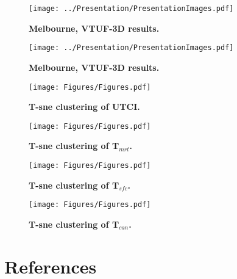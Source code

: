 \documentclass[final,3p,times,authoryear]{elsarticle}
\begin{document}
\begin{figure*}
\centering
\texttt{[image: ../Presentation/PresentationImages.pdf]}
\caption{\bf Melbourne, VTUF-3D results.}
 \label{fig:scenarios}
\end{figure*} 



\begin{figure*}
\centering
\texttt{[image: ../Presentation/PresentationImages.pdf]}
\caption{\bf Melbourne, VTUF-3D results.}
\end{figure*} 


\begin{figure*}
\centering
\texttt{[image: Figures/Figures.pdf]}
\caption{\bf T-sne clustering of UTCI.}
 \label{fig:clusterutci}
\end{figure*} 

\begin{figure*}
\centering
\texttt{[image: Figures/Figures.pdf]}
\caption{\bf T-sne clustering of T$_{mrt}$.}
 \label{fig:clustertmrt}
\end{figure*} 

\begin{figure*}
\centering
\texttt{[image: Figures/Figures.pdf]}
\caption{\bf T-sne clustering of T$_{sfc}$.}
 \label{fig:clustertsfc}
\end{figure*} 

\begin{figure*}
\centering
\texttt{[image: Figures/Figures.pdf]}
\caption{\bf T-sne clustering of T$_{can}$.}
 \label{fig:clustertsfc}
\end{figure*} 

\section*{References}\label{sec:ref}

   
   
\end{document}

